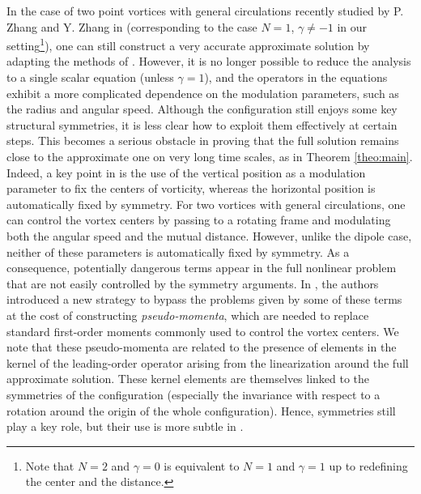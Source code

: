 \documentclass[11pt,reqno,a4paper]{amsart}
\newcommand{\1}{\mathbbm{1}}
\theoremstyle{definition}
\theoremstyle{definition}
\numberwithin{equation}{section}
\begin{document}
In the case of two point vortices with general circulations recently studied by P. Zhang and Y. Zhang  in \cite{zhang2025long} (corresponding to the case $N=1$, $\gamma\neq -1$ in our setting\footnote{Note that $N=2$ and $\gamma=0$ is equivalent to $N=1$ and $\gamma=1$ up to redefining the center and the distance.}), one can still construct a very accurate approximate solution by adapting the methods of \cite{dolce2024long}.  However, it is no longer possible to reduce the analysis to a single scalar equation (unless $\gamma=1$), and the operators in the equations exhibit a more complicated dependence on the modulation parameters, such as the radius and angular speed. Although the configuration still enjoys some key structural symmetries, it is less clear how to exploit them effectively at certain steps. This becomes a serious obstacle in proving that the full solution remains close to the approximate one on very long time scales, as in Theorem \ref{theo:main}. Indeed, a key point in \cite{dolce2024long} is the use of the vertical position as a modulation parameter to fix the centers of vorticity, whereas the horizontal position is automatically fixed by symmetry. For two vortices with general circulations, one can control the vortex centers by passing to a rotating frame and modulating both the angular speed and the mutual distance. However, unlike the dipole case, neither of these parameters is automatically fixed by symmetry. As a consequence, potentially dangerous terms appear in the full nonlinear problem that are not easily controlled by the symmetry arguments. In \cite{zhang2025long}, the authors introduced a new strategy to bypass the problems given by some of these terms at the cost of constructing \emph{pseudo-momenta}, which are needed to replace standard first-order moments commonly used to control the vortex centers. We note that these pseudo-momenta are related to the presence of elements in the kernel of the leading-order operator arising from the linearization around the full approximate solution. These kernel elements are themselves linked to the symmetries of the configuration (especially the invariance with respect to a rotation around the origin of the whole configuration). Hence, symmetries still play a key role, but their use is  more subtle in \cite{zhang2025long}.
\end{document}
